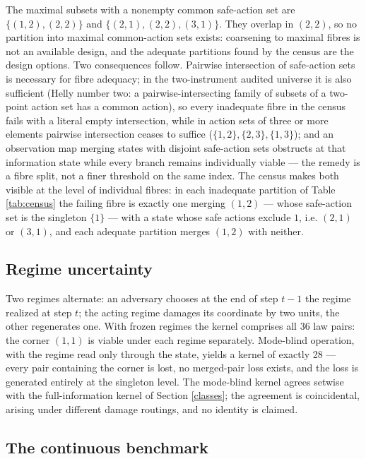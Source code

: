\documentclass[10pt,twocolumn]{article}
\theoremstyle{definition}
\begin{document}
The maximal subsets with a nonempty common safe-action set are
\(\{(1,2), (2,2)\}\) and \(\{(2,1), (2,2), (3,1)\}\). They overlap in
\((2,2)\), so no partition into maximal common-action sets exists:
coarsening to maximal fibres is not an available design, and the
adequate partitions found by the census are the design options. Two
consequences follow. Pairwise intersection of safe-action sets is necessary for fibre
adequacy; in the two-instrument audited universe it is also sufficient
(Helly number two: a pairwise-intersecting family of subsets of a
two-point action set has a common action), so every inadequate fibre in
the census fails with a literal empty intersection, while in action sets
of three or more elements pairwise intersection ceases to suffice
(\(\{1,2\}, \{2,3\}, \{1,3\}\)); and an
observation map merging states with disjoint safe-action sets obstructs
at that information state while every branch remains individually
viable --- the remedy is a fibre split, not a finer threshold on the
same index. The census makes both visible at the level of individual
fibres: in each inadequate partition of Table \ref{tab:census} the
failing fibre is exactly one merging \((1,2)\) --- whose safe-action
set is the singleton \(\{1\}\) --- with a state whose safe actions
exclude \(1\), i.e. \((2,1)\) or \((3,1)\), and each adequate
partition merges \((1,2)\) with neither.

\subsection{Regime uncertainty}\label{regimes}

Two regimes alternate: an adversary chooses at the end of step
\(t - 1\) the regime realized at step \(t\); the acting regime damages
its coordinate by two units, the other regenerates one. With frozen
regimes the kernel comprises all \(36\) law pairs: the corner \((1,1)\)
is viable under
each regime separately. Mode-blind operation, with the regime read only
through the state, yields a kernel of exactly 28 --- every pair
containing the corner is lost, no merged-pair loss exists, and the loss
is generated entirely at the singleton level. The mode-blind kernel
agrees setwise with the full-information kernel of Section
\ref{classes}; the agreement is coincidental, arising under different
damage routings, and no identity is claimed.

\subsection{The continuous benchmark}\label{benchmark}
\end{document}
